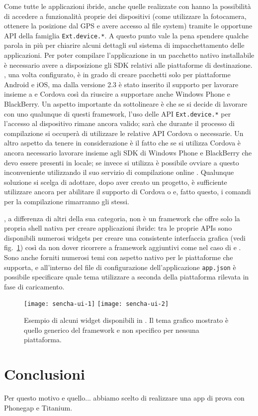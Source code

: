 			Come tutte le applicazioni ibride, anche quelle realizzate con
			\senchat{} hanno la possibilità di accedere a funzionalità proprie
			dei dispositivi (come utilizzare la fotocamera, ottenere la posizione
			dal GPS e avere accesso al file sys\-tem) tramite le opportune API
			della famiglia \verb|Ext.device.*|. A questo punto vale la pena
			spendere qualche parola in più per chiarire alcuni dettagli sul
			sistema di impacchettamento delle applicazioni. Per poter compilare
			l'applicazione in un pacchetto nativo installabile è necessario
			avere a disposizione gli SDK relativi alle piattaforme di destinazione.
			\senchacmd{}, una volta configurato, è in grado di creare pacchetti
			solo per piattaforme Android e iOS, ma dalla versione 2.3 è stato
			inserito il supporto per lavorare insieme a \pg{} e Cordova così da
			riuscire a supportare anche Windows Phone e BlackBerry. Un aspetto
			importante da sottolineare è che se si decide di lavorare con uno
			qualunque di questi framework, l'uso delle API \verb|Ext.device.*| per
			l'accesso al dispositivo rimane ancora valido; sarà \senchacmd{} che
			durante il processo di compilazione si occuperà di utilizzare le
			relative API Cordova o \pg{} necessarie. Un altro aspetto da
			tenere in considerazione è il fatto che se si utilizza Cordova è
			ancora necessario lavorare insieme agli SDK di Windows Phone e BlackBerry
			che devo essere presenti in locale; se invece si utilizza \pg{} è
			possibile ovviare a questo inconveniente utilizzando il suo servizio
			di compilazione online \pgb{}. Qualunque soluzione si scelga di
			adottare, dopo aver creato un progetto, è sufficiente utilizzare
			ancora \senchacmd{} per abilitare il supporto di Cordova o \pg{} e,
			fatto questo, i comandi per la compilazione rimarranno gli stessi.
			
			\senchat{}, a differenza di altri della sua categoria, non è un
			framework che offre	solo la propria shell nativa per creare
			applicazioni ibride: tra le	proprie APIs sono disponibili numerosi
			widgets per creare una consistente interfaccia grafica
			(vedi fig.~\ref{fig:senchaui}) così da non dover ricorrere a
			framework aggiuntivi come nel caso di \pg{} e \rhom{}. Sono anche
			forniti numerosi temi con aspetto nativo per le piattaforme che
			supporta, e all'interno del file di configurazione dell'applicazione
			\verb|app.json| è possibile specificare quale tema utilizzare a
			seconda della piattaforma rilevata in fase di caricamento.
			\begin{figure}[h]
				\centering
				\texttt{[image: sencha-ui-1]}
				\texttt{[image: sencha-ui-2]}
				\label{fig:senchaui}
				\caption{
					Esempio di alcuni widget disponibili in \senchat{}.
					Il tema grafico mostrato è quello generico del framework e
					non specifico per nessuna piattaforma.
				}
			\end{figure}
			
	
	\section{Conclusioni}
		Per questo motivo e quello... abbiamo scelto di realizzare una app di 
		prova con Phonegap e Titanium.
